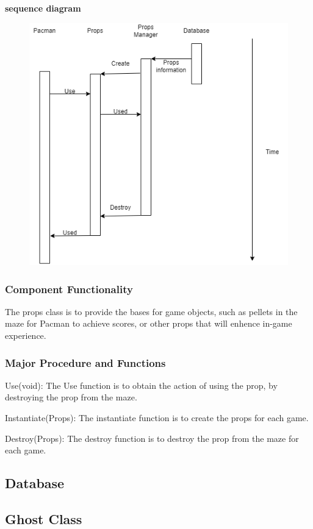 \documentclass[11pt]{article}
\begin{document}
\textbf{sequence diagram}\\
\begin{figure}[H]
    \centering
    \includegraphics*[scale=0.4]{Props_sequence.png}
\end{figure}
\subsubsection{Component Functionality}
The props class is to provide the bases for game objects, such as pellets in the maze for Pacman to achieve scores, or other props that will enhence in-game experience.
\subsubsection{Major Procedure and Functions}
Use(void): The Use function is to obtain the action of using the prop, by destroying the prop from the maze.

Instantiate(Props): The instantiate function is to create the props for each game.

Destroy(Props): The destroy function is to destroy the prop from the maze for each game.

\subsection{Database}

\subsection{Ghost Class}
\end{document}
